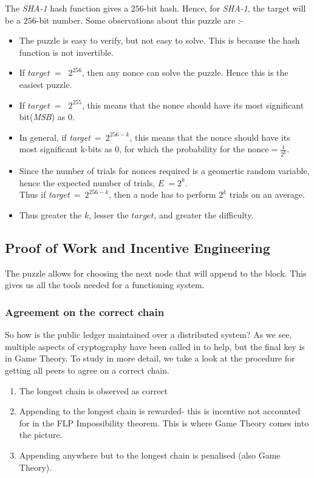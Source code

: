 \documentclass[10pt,a4paper]{article}
\begin{document}
The \emph{SHA-1} hash function gives a $256$-bit hash. Hence, for \emph{SHA-1}, the target will be a $256$-bit number.
Some observations about this puzzle are :-
\begin{itemize}
    \item The puzzle is easy to verify, but not easy to solve. This is because the hash function is not invertible.
    \item If $ target\ =\ $ $2^{256}$, then any nonce can solve the puzzle. Hence this is the easiest puzzle.
    \item If $ target\ =\ $ $2^{255}$, this means that the nonce should have its most significant bit(\emph{MSB}) as $0$.
    \item In general, if  \emph{target}\ =\  $2^{256-k}$, this means that the nonce should have its most significant k-bits as 0, for which the probability for the nonce$ = \frac{1}{2^k}$. 
    \item Since the number of trials for nonces required is a geomertic random variable, hence the expected number of trials, $E\ = 2^k$.\\ Thus if  \emph{target}\ =\  $2^{256-k}$, then a node has to perform $ 2^k$ trials on an 
    average.
    \item Thus greater the $k$, lesser the $target$, and greater the difficulty.
\end{itemize}

\subsection{Proof of Work and Incentive Engineering}
The puzzle allows for choosing the next node that will append to the block. This gives us all the tools needed for a functioning system. 

\subsubsection{Agreement on the correct chain}
So how is the public ledger maintained over a distributed system? As we see, multiple aspects of cryptography have been called in to help, but the final key is in Game Theory. To study in more detail, we take a look at the procedure for getting all peers to agree on a correct chain.
\begin{enumerate}
    \item The longest chain is observed as correct
    
    \item Appending to the longest chain is rewarded- this is incentive not accounted for in the FLP Impossibility theorem. This is where Game Theory comes into the picture.
    
    \item Appending anywhere but to the longest chain is penalised (also Game Theory).
\end{enumerate}
\end{document}
